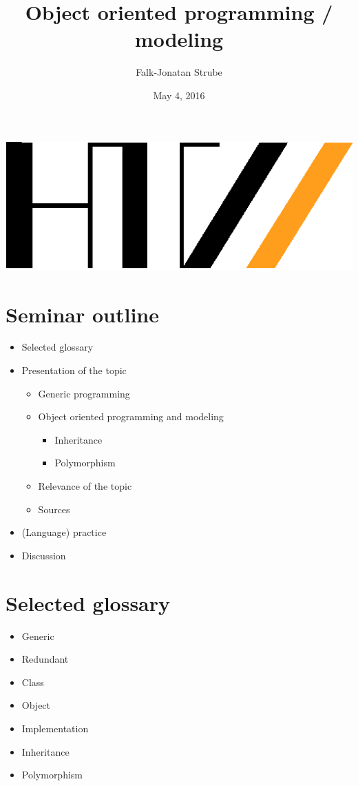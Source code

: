 



\title{Object oriented programming / modeling}
\author{Falk-Jonatan Strube}
\date{May 4, 2016} 



\begin{frame}[plain]
\begin{center}
\includegraphics[width=.3\textwidth]{../../../.LaTeX_master/HTW-Logo.eps}
\end{center}
\maketitle
\end{frame}
\section*{Seminar outline}
\begin{frame}
\begin{itemize}
\setlength\itemsep{1em}
\item Selected glossary
\item Presentation of the topic
\begin{itemize}
\item Generic programming
\item Object oriented programming and modeling
\begin{itemize}
\item Inheritance
\item Polymorphism
\end{itemize}
\item Relevance of the topic
\item Sources
\end{itemize}
\item (Language) practice
\item Discussion
\end{itemize}
\end{frame}

\section*{Selected glossary}
\begin{frame}
\begin{itemize}
\setlength\itemsep{1em}
\item Generic
\item Redundant
\item Class
\item Object
\item Implementation
\item Inheritance
\item Polymorphism
\end{itemize}
\end{frame}

